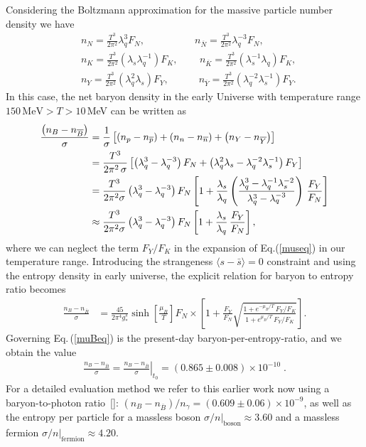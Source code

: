 Considering the Boltzmann approximation for the massive particle number density we have
\begin{align}
\label{Density_N}
&n_N=\frac{T^3}{2\pi^2}\lambda_q^3F_N,\quad\qquad\qquad n_{\overline N}=\frac{T^3}{2\pi^2}\lambda^{-3}_qF_N,\\
\label{Density_K}
&n_K=\frac{T^3}{2\pi^2}\left(\lambda_s\lambda_q^{-1}\right)F_K,\,\qquad n_{\overline{K}}=\frac{T^3}{2\pi^2}\left(\lambda_s^{-1}\lambda_q\right)F_K,\\
\label{Density_Y}
&n_Y=\frac{T^3}{2\pi^2}\left(\lambda_q^2\lambda_s\right)F_Y,\quad\qquad n_{\overline Y}=\frac{T^3}{2\pi^2}\left(\lambda^{-2}_q\lambda_s^{-1}\right)F_Y.
\end{align}
In this case, the net baryon density in the early Universe with temperature range $150\,\mathrm{MeV}> T>10$\,MeV can be written as 
\begin{align}
\frac{\left(n_B-n_{\overline{B}}\right)}{\sigma}&=\frac{1}{\sigma}\left[\left(n_p-n_{\overline{p}}\right)+\left(n_n-n_{\overline{n}}\right)+\left(n_Y-n_{\overline{Y}}\right)\right]\notag\\
&=\frac{T^3}{2\pi^2\,\sigma}\left[\left(\lambda_q^3-\lambda^{-3}_q\right)F_N+\left(\lambda_q^2\lambda_s-\lambda^{-2}_q\lambda_s^{-1}\right)F_Y\right]\notag\\
&=\frac{T^3}{2\pi^2\sigma}\left(\lambda_q^3-\lambda_q^{-3}\right)F_N\left[1+\frac{\lambda_s}{\lambda_q}\left(\frac{\lambda_q^3-\lambda^{-1}_q\lambda_s^{-2}}{\lambda^3_q-\lambda^{-3}_q}\right)\,\frac{F_Y}{F_N}\right]\notag\\
&\approx\frac{T^3}{2\pi^2\sigma}\left(\lambda_q^3-\lambda_q^{-3}\right)F_N\left[1+\frac{\lambda_s}{\lambda_q}\,\frac{F_Y}{F_N}\right],
\end{align}
where we can neglect the term $F_Y/F_K$ in the expansion of Eq.(\ref{museq}) in our temperature range. Introducing the strangeness $\langle s-\bar s\rangle=0$ constraint and using the entropy density in early universe, the explicit relation for baryon to entropy ratio becomes
\begin{align}\label{muBeq}
\frac{n_B-n_{\overline{B}}}{\sigma}&=\frac{45}{2\pi^4g^s_\ast}\sinh\left[\frac{\mu_B}{T}\right]F_N\times\left[1+\frac{F_Y}{F_N}\sqrt{\frac{1+e^{-\mu_B/T}\,F_Y/F_K}{1+e^{\mu_B/T}\,F_Y/F_K}}\right].
\end{align}
Governing Eq.\,(\ref{muBeq}) is the present-day baryon-per-entropy-ratio, and we obtain the value 
\begin{align}\label{BdS}
\frac{n_B-n_{\overline{B}}}{\sigma}= \left.\frac{n_B-n_{\overline{B}}}{ \sigma}\right|_{t_0}=(0.865\pm0.008)\times10^{-10} \;.
\end{align}
For a detailed evaluation method we refer to this earlier work now using a baryon-to-photon ratio~[\cite{ParticleDataGroup:2018ovx}]: $\left(n_B-n_{\overline{B}}\right)/n_\gamma= (0.609\pm0.06)\times10^{-9}$, as well as the entropy per particle for a massless boson $\sigma/n|_\mathrm{boson}\approx 3.60$ and a massless fermion $\sigma/n|_\mathrm{fermion}\approx 4.20$. 

